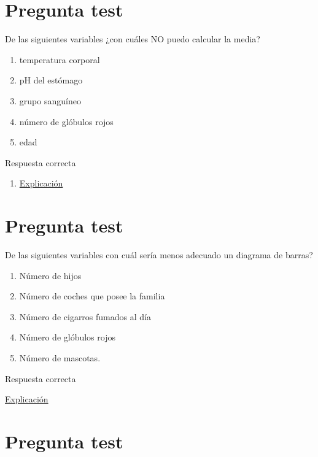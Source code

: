 \documentclass[
]{book}
\providecommand{\tightlist}{%
  \setlength{\itemsep}{0pt}\setlength{\parskip}{0pt}}
\begin{document}
\hypertarget{pregunta-test-87}{%
\section{Pregunta test}\label{pregunta-test-87}}

De las siguientes variables ¿con cuáles NO puedo calcular la media?

\begin{enumerate}
\def\labelenumi{\alph{enumi})}
\tightlist
\item
  temperatura corporal
\item
  pH del estómago
\item
  grupo sanguíneo
\item
  número de glóbulos rojos
\item
  edad
\end{enumerate}

Respuesta correcta

\begin{enumerate}
\def\labelenumi{\alph{enumi})}
\setcounter{enumi}{2}
\tightlist
\item
  \href{https://1fjmanzano.github.io/bioestadistica/tipos-de-variables.html}{Explicación}
\end{enumerate}

\hypertarget{pregunta-test-88}{%
\section{Pregunta test}\label{pregunta-test-88}}

De las siguientes variables con cuál sería menos adecuado un diagrama de barras?

\begin{enumerate}
\def\labelenumi{\alph{enumi})}
\tightlist
\item
  Número de hijos
\item
  Número de coches que posee la familia
\item
  Número de cigarros fumados al día
\item
  Número de glóbulos rojos
\item
  Número de mascotas.
\end{enumerate}

Respuesta correcta

\href{https://1fjmanzano.github.io/bioestadistica/representaciones-gra\%CC\%81ficas.html}{Explicación}

\hypertarget{pregunta-test-89}{%
\section{Pregunta test}\label{pregunta-test-89}}
\end{document}
